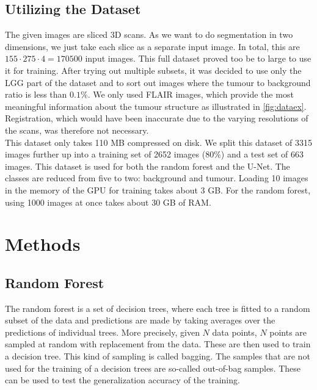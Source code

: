 \documentclass[final]{article}
\begin{document}
\subsection{Utilizing the Dataset}
The given images are sliced 3D scans. As we want to do segmentation in two
dimensions, we just take each slice as a separate input image. In total, this
are $155\cdot275\cdot4 = 170500$ input images. This full dataset proved too be
to large to use it for training. After trying out multiple subsets, it was
decided to use only the LGG part of the dataset and to sort out images where
the tumour to background ratio is less than $0.1\%$. We only used FLAIR images, which provide the most meaningful information about the tumour structure as illustrated in \cref{fig:dataex}. Registration, which would have been inaccurate due to the varying resolutions of the scans, was therefore not necessary.\\ 

This dataset only takes
110 MB compressed on disk. We split this dataset of 3315 images further
up into a training set of 2652 images ($80\%$) and a test set of 663 images.
This dataset is used for both the random forest and the U-Net. The classes are
reduced from five to two: background and tumour. Loading 10 images in the memory
of the GPU for training takes about 3 GB. For the random forest, using
1000 images at once takes about 30 GB of RAM.

\section{Methods} \label{sec:methods}
\subsection{Random Forest}
The random forest is a set of decision trees, where each tree is fitted to a
random subset of the data and predictions are made by taking averages over the
predictions of individual trees. More precisely, given $N$ data points, $N$
points are sampled at random with replacement from the data. These are then
used to train a decision tree. This kind of sampling is called bagging. The
samples that are not used for the training of a decision trees are so-called
out-of-bag samples. These can be used to test the generalization accuracy of
the training.\\
\end{document}
